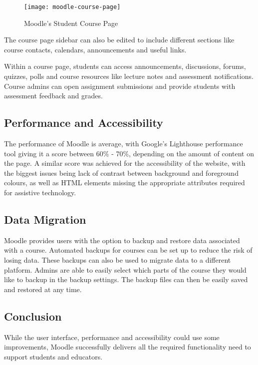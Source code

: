 \begin{figure}[h!]
    \centering
    \texttt{[image: moodle-course-page]}
    \caption{Moodle's Student Course Page}
\end{figure}

The course page sidebar can also be edited to include different sections like course contacts, calendars, announcements and useful links.

Within a course page, students can access announcements, discussions, forums, quizzes, polls and course resources like lecture notes and assessment notifications.
Course admins can open assignment submissions and provide students with assessment feedback and grades.

\subsection{Performance and Accessibility}
The performance of Moodle is average, with Google's Lighthouse performance tool giving it a score between 60\% - 70\%, depending on the amount of content on the page.
A similar score was achieved for the accessibility of the website, with the biggest issues being lack of contrast between background and foreground colours, as well as HTML elements missing the appropriate attributes required for assistive technology.

\subsection{Data Migration}
Moodle provides users with the option to backup and restore data associated with a course.
Automated backups for courses can be set up to reduce the risk of losing data.
These backups can also be used to migrate data to a different platform.
Admins are able to easily select which parts of the course they would like to backup in the backup settings.
The backup files can then be easily saved and restored at any time.

\subsection{Conclusion}
While the user interface, performance and accessibility could use some improvements, Moodle successfully delivers all the required functionality need to support students and educators.